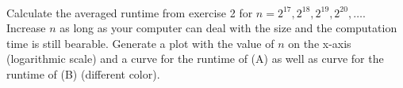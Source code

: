  \\
Calculate the averaged runtime from exercise 2 for
$n = 2^{17}, 2^{18}, 2^{19}, 2^{20}, \dots$.
Increase $n$ as long as your computer can deal with the size and the computation
time is still bearable.
Generate a plot with the value of $n$ on the x-axis (logarithmic scale)
and a curve for the runtime of (A) as well as curve for the runtime of (B)
(different color).
